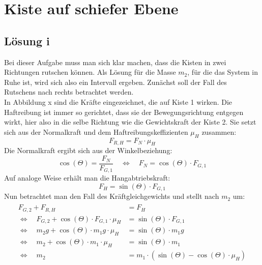 \section{Kiste auf schiefer Ebene}
\subsection{Lösung i}
  Bei dieser Aufgabe muss man sich klar machen, dass die Kisten in zwei Richtungen rutschen können. Als Lösung
  für die Masse $m_2$, für die das System in Ruhe ist, wird sich also ein Intervall ergeben.
  Zunächst soll der Fall des Rutschens nach rechts betrachtet werden. \\
  In Abbildung x sind die Kräfte eingezeichnet, die auf Kiste 1 wirken. Die Haftreibung ist immer so gerichtet, dass
  sie der Bewegungsrichtung entgegen wirkt, hier also in die selbe Richtung wie die Gewichtskraft der Kiste 2. Sie setzt
  sich aus der Normalkraft und dem Haftreibungskeffizienten $\mu_H$ zusammen:
  \begin{equation}
    F_{R,H} = F_N \cdot \mu_H
  \end{equation}
  Die Normalkraft ergibt sich aus der Winkelbeziehung:
  \begin{equation}
    \cos\left(\Theta\right) = \frac{F_N}{F_{G,1}}\quad \Leftrightarrow\quad F_N = \cos\left(\Theta\right) \cdot F_{G,1}
  \end{equation}
  Auf analoge Weise erhält man die Hangabtriebskraft:
  \begin{equation}
     F_H = \sin\left(\Theta\right) \cdot F_{G,1}
  \end{equation}
  Nun betrachtet man den Fall des Kräftgleichgewichts und stellt nach $m_2$ um:
  \begin{align}
    \begin{aligned}
      F_{G,2} + F_{R,H} &= F_H\\
    \Leftrightarrow \quad  F_{G,2} + \cos\left(\Theta\right) \cdot F_{G,1} \cdot \mu_H &= \sin\left(\Theta\right) \cdot F_{G,1} \\
    \Leftrightarrow \quad m_2 g + \cos\left(\Theta\right) \cdot m_1 g \cdot \mu_H &= \sin\left(\Theta\right) \cdot m_1 g \\
    \Leftrightarrow \quad m_2  + \cos\left(\Theta\right) \cdot m_1  \cdot \mu_H &= \sin\left(\Theta\right) \cdot m_1  \\
    \Leftrightarrow \quad m_2 &= m_1 \cdot (\sin\left(\Theta\right) - \cos\left(\Theta\right)  \cdot \mu_H)
  \end{aligned}
  \label{eq: m_2}
  \end{align}
